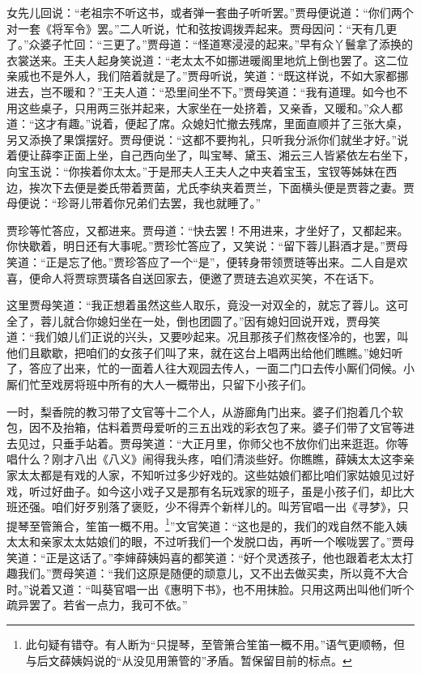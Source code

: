 女先儿回说：“老祖宗不听这书，或者弹一套曲子听听罢。”贾母便说道：“你们两个对一套《将军令》罢。”二人听说，忙和弦按调拨弄起来。贾母因问：“天有几更了。”众婆子忙回：“三更了。”贾母道：“怪道寒浸浸的起来。”早有众丫鬟拿了添换的衣裳送来。王夫人起身笑说道：“老太太不如挪进暖阁里地炕上倒也罢了。这二位亲戚也不是外人，我们陪着就是了。”贾母听说，笑道：“既这样说，不如大家都挪进去，岂不暖和？”王夫人道：“恐里间坐不下。”贾母笑道：“我有道理。如今也不用这些桌子，只用两三张并起来，大家坐在一处挤着，又亲香，又暖和。”众人都道：“这才有趣。”说着，便起了席。众媳妇忙撤去残席，里面直顺并了三张大桌，另又添换了果馔摆好。贾母便说：“这都不要拘礼，只听我分派你们就坐才好。”说着便让薛李正面上坐，自己西向坐了，叫宝琴、黛玉、湘云三人皆紧依左右坐下，向宝玉说：“你挨着你太太。”于是邢夫人王夫人之中夹着宝玉，宝钗等姊妹在西边，挨次下去便是娄氏带着贾菌，尤氏李纨夹着贾兰，下面横头便是贾蓉之妻。贾母便说：“珍哥儿带着你兄弟们去罢，我也就睡了。”

贾珍等忙答应，又都进来。贾母道：“快去罢！不用进来，才坐好了，又都起来。你快歇着，明日还有大事呢。”贾珍忙答应了，又笑说：“留下蓉儿斟酒才是。”贾母笑道：“正是忘了他。”贾珍答应了一个“是”，便转身带领贾琏等出来。二人自是欢喜，便命人将贾琮贾璜各自送回家去，便邀了贾琏去追欢买笑，不在话下。

这里贾母笑道：“我正想着虽然这些人取乐，竟没一对双全的，就忘了蓉儿。这可全了，蓉儿就合你媳妇坐在一处，倒也团圆了。”因有媳妇回说开戏，贾母笑道：“我们娘儿们正说的兴头，又要吵起来。况且那孩子们熬夜怪冷的，也罢，叫他们且歇歇，把咱们的女孩子们叫了来，就在这台上唱两出给他们瞧瞧。”媳妇听了，答应了出来，忙的一面着人往大观园去传人，一面二门口去传小厮们伺候。小厮们忙至戏房将班中所有的大人一概带出，只留下小孩子们。

一时，梨香院的教习带了文官等十二个人，从游廊角门出来。婆子们抱着几个软包，因不及抬箱，估料着贾母爱听的三五出戏的彩衣包了来。婆子们带了文官等进去见过，只垂手站着。贾母笑道：“大正月里，你师父也不放你们出来逛逛。你等唱什么？刚才八出《八义》闹得我头疼，咱们清淡些好。你瞧瞧，薛姨太太这李亲家太太都是有戏的人家，不知听过多少好戏的。这些姑娘们都比咱们家姑娘见过好戏，听过好曲子。如今这小戏子又是那有名玩戏家的班子，虽是小孩子们，却比大班还强。咱们好歹别落了褒贬，少不得弄个新样儿的。叫芳官唱一出《寻梦》，只提琴至管箫合，笙笛一概不用。\footnote{此句疑有错夺。有人断为“只提琴，至管箫合笙笛一概不用。”语气更顺畅，但与后文薛姨妈说的“从没见用箫管的”矛盾。暂保留目前的标点。}”文官笑道：“这也是的，我们的戏自然不能入姨太太和亲家太太姑娘们的眼，不过听我们一个发脱口齿，再听一个喉咙罢了。”贾母笑道：“正是这话了。”李婶薛姨妈喜的都笑道：“好个灵透孩子，他也跟着老太太打趣我们。”贾母笑道：“我们这原是随便的顽意儿，又不出去做买卖，所以竟不大合时。”说着又道：“叫葵官唱一出《惠明下书》，也不用抹脸。只用这两出叫他们听个疏异罢了。若省一点力，我可不依。”

